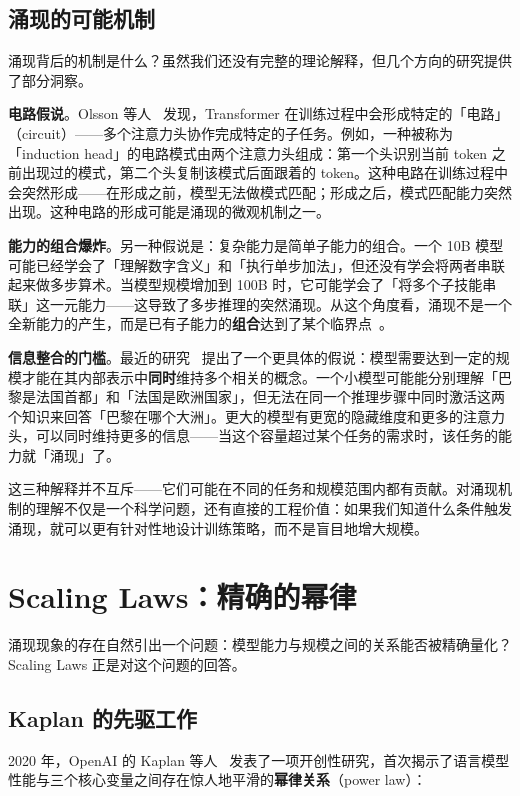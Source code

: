 \subsection{涌现的可能机制}

涌现背后的机制是什么？虽然我们还没有完整的理论解释，但几个方向的研究提供了部分洞察。

\textbf{电路假说}。Olsson 等人~\cite{olsson2022induction} 发现，Transformer 在训练过程中会形成特定的「电路」（circuit）——多个注意力头协作完成特定的子任务。例如，一种被称为「induction head」的电路模式由两个注意力头组成：第一个头识别当前 token 之前出现过的模式，第二个头复制该模式后面跟着的 token。这种电路在训练过程中会突然形成——在形成之前，模型无法做模式匹配；形成之后，模式匹配能力突然出现。这种电路的形成可能是涌现的微观机制之一。

\textbf{能力的组合爆炸}。另一种假说是：复杂能力是简单子能力的组合。一个 10B 模型可能已经学会了「理解数字含义」和「执行单步加法」，但还没有学会将两者串联起来做多步算术。当模型规模增加到 100B 时，它可能学会了「将多个子技能串联」这一元能力——这导致了多步推理的突然涌现。从这个角度看，涌现不是一个全新能力的产生，而是已有子能力的\textbf{组合}达到了某个临界点~\cite{arora2023theory}。

\textbf{信息整合的门槛}。最近的研究~\cite{wei2023larger} 提出了一个更具体的假说：模型需要达到一定的规模才能在其内部表示中\textbf{同时}维持多个相关的概念。一个小模型可能能分别理解「巴黎是法国首都」和「法国是欧洲国家」，但无法在同一个推理步骤中同时激活这两个知识来回答「巴黎在哪个大洲」。更大的模型有更宽的隐藏维度和更多的注意力头，可以同时维持更多的信息——当这个容量超过某个任务的需求时，该任务的能力就「涌现」了。

这三种解释并不互斥——它们可能在不同的任务和规模范围内都有贡献。对涌现机制的理解不仅是一个科学问题，还有直接的工程价值：如果我们知道什么条件触发涌现，就可以更有针对性地设计训练策略，而不是盲目地增大规模。

\section{Scaling Laws：精确的幂律}
\label{sec:scaling-laws}

涌现现象的存在自然引出一个问题：模型能力与规模之间的关系能否被精确量化？Scaling Laws 正是对这个问题的回答。

\subsection{Kaplan 的先驱工作}

2020 年，OpenAI 的 Kaplan 等人~\cite{kaplan2020scaling} 发表了一项开创性研究，首次揭示了语言模型性能与三个核心变量之间存在惊人地平滑的\textbf{幂律关系}（power law）：


